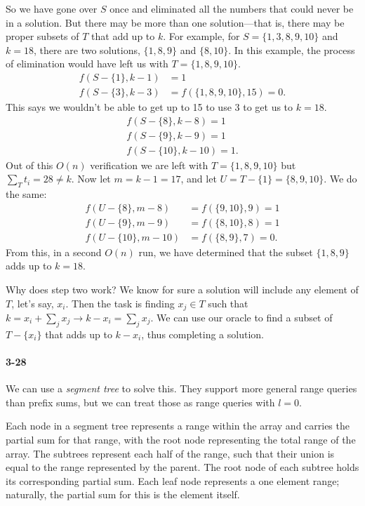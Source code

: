 \documentclass{report}
\begin{document}
So we have gone over $S$ once and eliminated all the numbers that could never be in a solution. But there may be more than one solution---that is, there may be proper subsets of $T$ that add up to $k$. For example, for $S=\{1,3,8,9,10\}$ and $k=18$, there are two solutions, $\{1,8,9\}$ and $\{8,10\}$. In this example, the process of elimination would have left us with $T=\{1,8,9,10\}$.
\begin{align*}
	f(S-\{1\}, k-1) &= 1 \\
	f(S-\{3\}, k-3) &= f(\{1,8,9,10\}, 15) = 0.
\end{align*}
This says we wouldn't be able to get up to 15 to use 3 to get us to $k=18$.
\begin{align*}
	f(S-\{8\}, k-8) = 1 \\
	f(S-\{9\}, k-9) = 1 \\
	f(S-\{10\}, k-10) = 1.
\end{align*}
Out of this $O(n)$ verification we are left with $T=\{1,8,9,10\}$ but $\sum_T t_i = 28 \ne k$. Now let $m=k-1=17$, and let $U=T-\{1\}=\{8,9,10\}$. We do the same:
\begin{align*}
	f(U-\{8\}, m-8) &= f(\{9,10\}, 9) = 1 \\
	f(U-\{9\}, m-9) &= f(\{8,10\}, 8) = 1 \\
	f(U-\{10\}, m-10) &= f(\{8,9\}, 7) = 0.
\end{align*}
From this, in a second $O(n)$ run, we have determined that the subset $\{1,8,9\}$ adds up to $k=18$.

Why does step two work? We know for sure a solution will include any element of $T$, let's say, $x_i$. Then the task is finding $x_j\in T$ such that $k = x_i + \sum_j x_j \rightarrow k-x_i = \sum_j x_j$. We can use our oracle to find a subset of $T-\{x_i\}$ that adds up to $k-x_i$, thus completing a solution.

\paragraph{3-28} We can use a \emph{segment tree} to solve this. They support more general range queries than prefix sums, but we can treat those as range queries with $l=0$.

Each node in a segment tree represents a range within the array and carries the partial sum for that range, with the root node representing the total range of the array. The subtrees represent each half of the range, such that their union is equal to the range represented by the parent. The root node of each subtree holds its corresponding partial sum. Each leaf node represents a one element range; naturally, the partial sum for this is the element itself.
\end{document}
